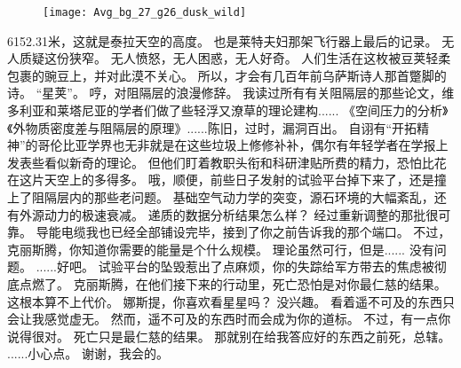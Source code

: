 \documentclass[openany]{book}
\begin{document}
\begin{figure}[h]
    \centering
    \texttt{[image: Avg\_bg\_27\_g26\_dusk\_wild]}
\end{figure}
\begin{dialogue}
     6152.31米，这就是泰拉天空的高度。
     也是莱特夫妇那架飞行器上最后的记录。
     无人质疑这份狭窄。
     无人愤怒，无人困惑，无人好奇。
     人们生活在这枚被豆荚轻柔包裹的豌豆上，并对此漠不关心。
     所以，才会有几百年前乌萨斯诗人那首蹩脚的诗。
     “星荚”。
     哼，对阻隔层的浪漫修辞。
     我读过所有有关阻隔层的那些论文，维多利亚和莱塔尼亚的学者们做了些轻浮又潦草的理论建构......
     《空间压力的分析》《外物质密度差与阻隔层的原理》......陈旧，过时，漏洞百出。
     自诩有“开拓精神”的哥伦比亚学界也无非就是在这些垃圾上修修补补，偶尔有年轻学者在学报上发表些看似新奇的理论。
     但他们盯着教职头衔和科研津贴所费的精力，恐怕比花在这片天空上的多得多。
     哦，顺便，前些日子发射的试验平台掉下来了，还是撞上了阻隔层内的那些老问题。
     基础空气动力学的突变，源石环境的大幅紊乱，还有外源动力的极速衰减。
     递质的数据分析结果怎么样？
     经过重新调整的那批很可靠。
     导能电缆我也已经全部铺设完毕，接到了你之前告诉我的那个端口。
     不过，克丽斯腾，你知道你需要的能量是个什么规模。
     理论虽然可行，但是......
     没有问题。
     ......好吧。
     试验平台的坠毁惹出了点麻烦，你的失踪给军方带去的焦虑被彻底点燃了。
     克丽斯腾，在他们接下来的行动里，死亡恐怕是对你最仁慈的结果。
     这根本算不上代价。
     娜斯提，你喜欢看星星吗？
     没兴趣。
     看着遥不可及的东西只会让我感觉虚无。
     然而，遥不可及的东西时而会成为你的道标。
     不过，有一点你说得很对。
     死亡只是最仁慈的结果。
     那就别在给我答应好的东西之前死，总辖。
     ......小心点。
     谢谢，我会的。
\end{dialogue}
\end{document}
